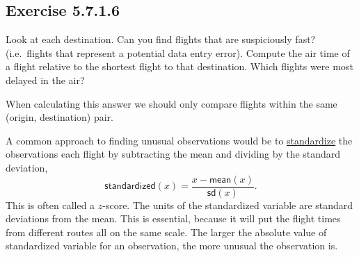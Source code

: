 \documentclass[]{book}
\newenvironment{Shaded}{\begin{snugshade}}{\end{snugshade}}
\newcommand{\DataTypeTok}[1]{\textcolor[rgb]{0.13,0.29,0.53}{#1}}
\newcommand{\KeywordTok}[1]{\textcolor[rgb]{0.13,0.29,0.53}{\textbf{#1}}}
\newcommand{\NormalTok}[1]{#1}
\newcommand{\OperatorTok}[1]{\textcolor[rgb]{0.81,0.36,0.00}{\textbf{#1}}}
\newcommand{\StringTok}[1]{\textcolor[rgb]{0.31,0.60,0.02}{#1}}
\theoremstyle{plain}
\theoremstyle{remark}
\begin{document}
\hypertarget{exercise-5.7.1.6}{%
\subsection*{\texorpdfstring{Exercise
{5.7.1.6}}{Exercise 5.7.1.6}}\label{exercise-5.7.1.6}}

Look at each destination. Can you find flights that are suspiciously
fast? (i.e.~flights that represent a potential data entry error).
Compute the air time of a flight relative to the shortest flight to that
destination. Which flights were most delayed in the air?

When calculating this answer we should only compare flights within the
same (origin, destination) pair.

A common approach to finding unusual observations would be to
\href{https://en.wikipedia.org/wiki/Standard_score}{standardize} the
observations each flight by subtracting the mean and dividing by the
standard deviation, \[
\mathsf{standardized}(x) = \frac{x - \mathsf{mean}(x)}{\mathsf{sd}(x)} .
\] This is often called a \(z\)-score. The units of the standardized
variable are standard deviations from the mean. This is essential,
because it will put the flight times from different routes all on the
same scale. The larger the absolute value of standardized variable for
an observation, the more unusual the observation is.

\begin{Shaded}
\end{Shaded}
\end{document}
